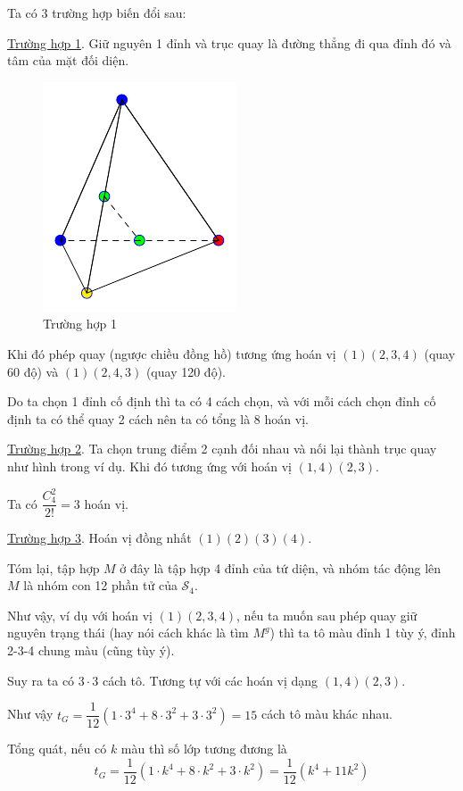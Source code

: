 Ta có 3 trường hợp biến đổi sau:

\underline{Trường hợp 1}. Giữ nguyên 1 đỉnh và trục quay là đường thẳng đi qua đỉnh đó và tâm của mặt đối diện.

\begin{figure}[htb]
    \centering
    \includegraphics[page=4]{figures/tetrahedron.pdf}
    \caption{Trường hợp 1}
\end{figure}

Khi đó phép quay (ngược chiều đồng hồ) tương ứng hoán vị $(1)(2,3,4)$ (quay 60 độ) và $(1)(2,4,3)$ (quay 120 độ).

Do ta chọn 1 đỉnh cố định thì ta có 4 cách chọn, và với mỗi cách chọn đỉnh cố định ta có thể quay 2 cách nên ta có tổng là 8 hoán vị.

\underline{Trường hợp 2}. Ta chọn trung điểm 2 cạnh đối nhau và nối lại thành trục quay như hình trong ví dụ. Khi đó tương ứng với hoán vị $(1,4)(2,3)$.

Ta có $\dfrac{C^2_4}{2!} = 3$ hoán vị.

\underline{Trường hợp 3}. Hoán vị đồng nhất $(1)(2)(3)(4)$.

Tóm lại, tập hợp $M$ ở đây là tập hợp 4 đỉnh của tứ diện, và nhóm tác động lên $M$ là nhóm con 12 phần tử của $\mathcal{S}_4$.

Như vậy, ví dụ với hoán vị $(1)(2,3,4)$, nếu ta muốn sau phép quay giữ nguyên trạng thái (hay nói cách khác là tìm $M^g$) thì ta
tô màu đỉnh 1 tùy ý, đỉnh 2-3-4 chung màu (cũng tùy ý).

Suy ra ta có $3 \cdot 3$ cách tô. Tương tự với các hoán vị dạng $(1,4)(2,3)$.

Như vậy $t_G = \dfrac{1}{12}(1 \cdot 3^4 + 8 \cdot 3^2 + 3 \cdot 3^2) = 15$ cách tô màu khác nhau.

Tổng quát, nếu có $k$ màu thì số lớp tương đương là
\[t_G = \dfrac{1}{12}\left(1 \cdot k^4 + 8 \cdot k^2 + 3 \cdot k^2\right) = \dfrac{1}{12}(k^4 + 11 k^2)\]

